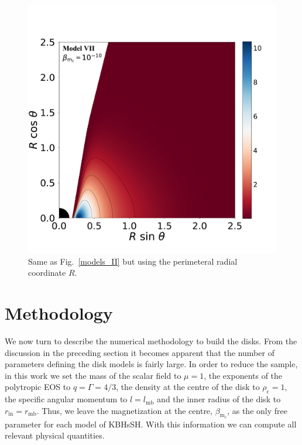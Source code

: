 \documentclass[twocolumn,aps,showpacs,showkeys,prd,superscriptaddress,byrevtex, amsmath]{revtex4-1}
\begin{document}
\begin{figure}
\hspace{-0.2cm}
\includegraphics[scale=0.14]{figures/fig4_VII__10.pdf}
\hspace{-0.2cm}
\caption{Same as Fig.~\ref{models_II} but using the perimeteral radial coordinate $R$.}
\label{models_peri_II}
\end{figure}

\section{Methodology}
\label{procedure}

We now turn to describe the numerical methodology to build the disks. From the discussion in the preceding section it becomes apparent that the number of parameters defining the disk models is fairly large. In order to reduce the sample, in this work we set the mass of the scalar field to $\mu = 1$, the exponents of the polytropic EOS to $q = \Gamma = 4/3$, the density at the centre of the disk to $\rho_{\mathrm{c}} = 1$, the specific angular momentum to $l = l_{\mathrm{mb}}$ and the inner radius of the disk to $r_{\mathrm{in}} = r_{\mathrm{mb}}$. Thus, we leave the magnetization at the centre, $\beta_{\mathrm{m_c}}$, as the only free parameter for each model of KBHsSH. With this information we can compute all relevant physical quantities.
\end{document}
